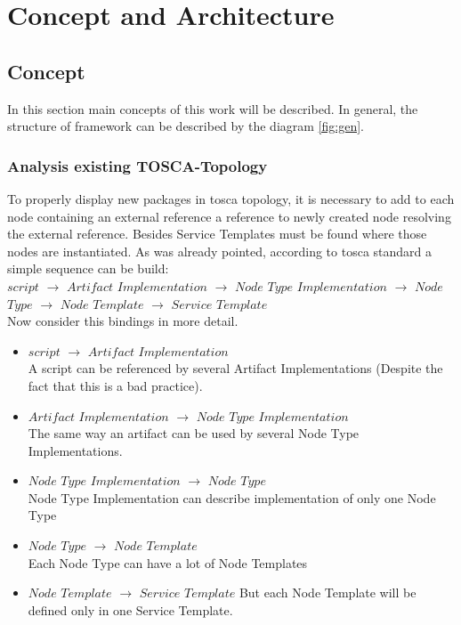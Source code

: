 
\chapter{Concept and Architecture}\label{chap:conarch}
\section{Concept}
In this section main concepts of this work will be described.
In general, the structure of framework can be described by the diagram \ref{fig:gen}.



\subsection{Analysis existing TOSCA-Topology}\label{subs:analyse}
To properly display new packages in \gls{tosca} topology, it is necessary to add to each node containing an external reference a reference to newly created node resolving the external reference. 
Besides Service Templates must be found where those nodes are instantiated.
As was already pointed, according to \gls{tosca} standard a simple sequence can be build:\\
$script$ $\rightarrow$ $Artifact$ $Implementation$ $\rightarrow$ $Node$ $Type$ $Implementation$ $\rightarrow$ $Node$ $Type$ $\rightarrow$ $Node$ $Template$ $\rightarrow$ $Service$ $Template$\\
Now consider this bindings in more detail. 
\begin{itemize}
	\item $script$ $\rightarrow$ $Artifact$ $Implementation$\\
	A script can be referenced by several Artifact Implementations (Despite the fact that this is a bad practice).
	\item  $Artifact$ $Implementation$ $\rightarrow$ $Node$ $Type$ $Implementation$ \\
	The same way an artifact can be used by several Node Type Implementations.
	\item $Node$ $Type$ $Implementation$ $\rightarrow$ $Node$ $Type$ \\
	Node Type Implementation can describe implementation of only one Node Type
	\item  $Node$ $Type$ $\rightarrow$ $Node$ $Template$\\
	Each Node Type can have a lot of Node Templates
	\item  $Node$ $Template$ $\rightarrow$ $Service$ $Template$
	But each Node Template will be defined only in one Service Template.
\end{itemize}
